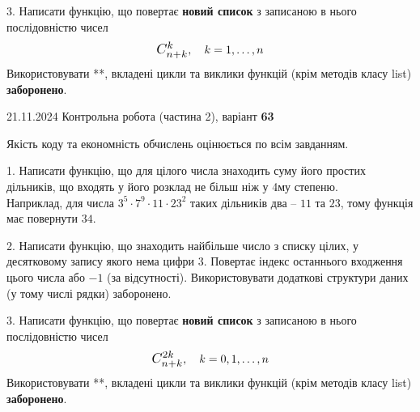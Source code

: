 \documentclass[12pt, ukrainian]{article}
\begin{document}
{{{\begin {large}
\vspace{10mm}


3. 
Написати функцію, що повертає \textbf{новий список} з записаною в нього послідовністю чисел
$$\scalebox{1.2}{$C_{n+k}^{k}$}, \quad k=1,\ldots,n$$
Використовувати **, вкладені цикли та виклики функцій (крім методів класу list) \textbf{заборонено}.

\end{large}
\vspace{25mm}


{{21.11.2024 Контрольна робота  (частина 2), варіант  \No \textbf { 63 }\par}}


{
\begin {large}
Якість коду та економність обчислень оцінюється по всім завданням.

\vspace{5mm}

1. Написати функцію, що для цілого числа знаходить суму його простих дільників, що входять у його розклад не більш ніж у 4му степеню. \\ Наприклад, для числа $3^5{\cdot}7^9{\cdot}11{\cdot}23^{2}$ таких дільників два – $11$ та $23$, тому функція має повернути $34$.

\vspace{10mm}


2. Написати функцію, що знаходить найбільше число з списку цілих, у десятковому запису якого нема цифри 3. Повертає індекс останнього входження цього числа або $-1$ (за відсутності). Використовувати додаткові структури даних (у тому числі рядки) заборонено.

\vspace{10mm}


3. 
Написати функцію, що повертає \textbf{новий список} з записаною в нього послідовністю чисел
$$\scalebox{1.2}{$C_{n+k}^{2k}$}, \quad k=0,1,\ldots,n$$
Використовувати **, вкладені цикли та виклики функцій (крім методів класу list) \textbf{заборонено}.


\end{large}}}}}
\end{document}
